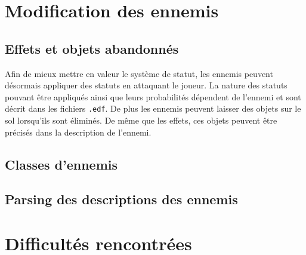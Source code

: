\documentclass[10pt,a4paper]{article}
\begin{document}
\section{Modification des ennemis}
\subsection{Effets et objets abandonnés}
Afin de mieux mettre en valeur le système de statut, les ennemis peuvent désormais appliquer des statuts en attaquant le joueur. La nature des statuts pouvant être appliqués ainsi que leurs probabilités dépendent de l'ennemi et sont décrit dans les fichiers \texttt{.edf}. De plus les ennemis peuvent laisser des objets sur le sol lorsqu'ils sont éliminés. De même que les effets, ces objets peuvent être précisés dans la description de l'ennemi.

\subsection{Classes d'ennemis}

\subsection{Parsing des descriptions des ennemis}

\section{Difficultés rencontrées}
\end{document}
